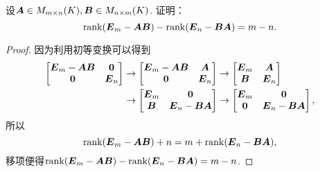 \begin{example}\label{example:单位矩阵与两矩阵乘积之差.单位矩阵与两矩阵乘积之差的秩}
设\(\boldsymbol{A} \in M_{m \times n}(K),
\boldsymbol{B} \in M_{n \times m}(K)\).
证明：\[
	\rank(\boldsymbol{E}_m-\boldsymbol{A}\boldsymbol{B})-\rank(\boldsymbol{E}_n-\boldsymbol{B}\boldsymbol{A})=m-n.
\]
\begin{proof}
因为利用初等变换可以得到\begin{align*}
	\begin{bmatrix}
		\boldsymbol{E}_m-\boldsymbol{A}\boldsymbol{B} & \boldsymbol0 \\
		\boldsymbol0 & \boldsymbol{E}_n
	\end{bmatrix}
	&\to \begin{bmatrix}
		\boldsymbol{E}_m-\boldsymbol{A}\boldsymbol{B} & \boldsymbol{A} \\
		\boldsymbol0 & \boldsymbol{E}_n
	\end{bmatrix}
	\to \begin{bmatrix}
		\boldsymbol{E}_m & \boldsymbol{A} \\
		\boldsymbol{B} & \boldsymbol{E}_n
	\end{bmatrix} \\
	&\to \begin{bmatrix}
		\boldsymbol{E}_m & \boldsymbol0 \\
		\boldsymbol{B} & \boldsymbol{E}_n-\boldsymbol{B}\boldsymbol{A}
	\end{bmatrix}
	\to \begin{bmatrix}
		\boldsymbol{E}_m & \boldsymbol0 \\
		\boldsymbol0 & \boldsymbol{E}_n-\boldsymbol{B}\boldsymbol{A}
	\end{bmatrix},
\end{align*}
所以\[
	\rank(\boldsymbol{E}_m-\boldsymbol{A}\boldsymbol{B})+n=m+\rank(\boldsymbol{E}_n-\boldsymbol{B}\boldsymbol{A}),
\]
移项便得\(\rank(\boldsymbol{E}_m-\boldsymbol{A}\boldsymbol{B})-\rank(\boldsymbol{E}_n-\boldsymbol{B}\boldsymbol{A})=m-n\).
\end{proof}
\end{example}


